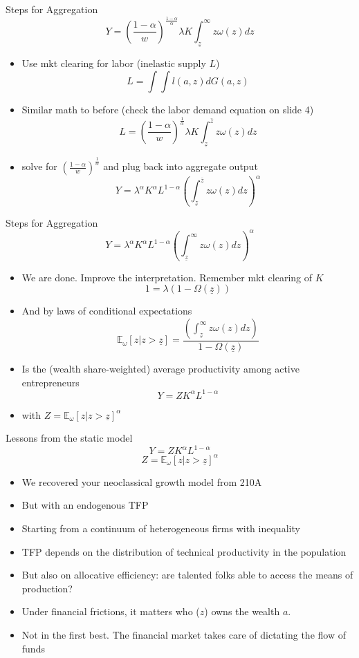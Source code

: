 \documentclass[11pt,aspectratio=169,xcolor={dvipsnames},hyperref={pdftex,pdfpagemode=UseNone,hidelinks,pdfdisplaydoctitle=true},usepdftitle=false]{beamer}
\begin{document}
\begin{frame}{Steps for Aggregation}
\[Y = \left(\frac{1-\alpha}{w}\right)^{\frac{1-\alpha}{\alpha}} \lambda K \int_{\underline{z}}^{\infty} z \omega(z) dz \]
\begin{itemize}
\item Use mkt clearing for labor (inelastic supply $L$)
\[L = \int \int l(a,z) dG(a,z)\]
\item Similar math to before (check the labor demand equation on slide 4)
\[L = \left(\frac{1-\alpha}{w}\right)^{\frac{1}{\alpha}} \lambda K  \int_{\underline{z}}^{\bar{z}} z \omega(z) dz\]
\item solve for $\left(\frac{1-\alpha}{w}\right)^{\frac{1}{\alpha}}$ and plug back into aggregate output
\[Y = \lambda^{\alpha} K^{\alpha} L^{1-\alpha} \left(\int_{\underline{z}}^{\bar{z}} z \omega(z) dz\right)^{\alpha}\]
\end{itemize}
\end{frame}

\begin{frame}{Steps for Aggregation}
\[Y = \lambda^{\alpha} K^{\alpha} L^{1-\alpha} \left(\int_{\underline{z}}^{\infty} z \omega(z) dz\right)^{\alpha}\]
\begin{itemize}
\item We are done. Improve the interpretation. Remember mkt clearing of $K$
\[1 = \lambda(1- \Omega(\underline{z}))\]
\item And by laws of conditional expectations
\[  \mathbb{E}_{\omega} \left[z| z> \underline{z} \right] = \frac{\left(\int_{\underline{z}}^{\infty} z \omega(z) dz\right)}{1-\Omega(\underline{z})} \]
\item Is the (wealth share-weighted) average productivity among active entrepreneurs
\[Y = ZK^{\alpha} L^{1-\alpha}\]
\item with $Z =  \mathbb{E}_{\omega} \left[z| z> \underline{z} \right]^{\alpha}$
\end{itemize}
\end{frame}


\begin{frame}{Lessons from the static model}
\[Y = ZK^{\alpha} L^{1-\alpha}\]
\[Z =  \mathbb{E}_{\omega} \left[z| z> \underline{z} \right]^{\alpha}\]

\begin{itemize}
\item We recovered your neoclassical growth model from 210A
\item But with an endogenous TFP
\item Starting from a continuum of heterogeneous firms with inequality
\item TFP depends on the distribution of technical productivity in the population
\item But also on allocative efficiency: are talented folks able to access the means of production?
\item Under financial frictions, it matters who ($z$) owns the wealth $a$.
\item Not in the first best. The financial market takes care of dictating the flow of funds
\end{itemize}

\end{frame}
\end{document}
